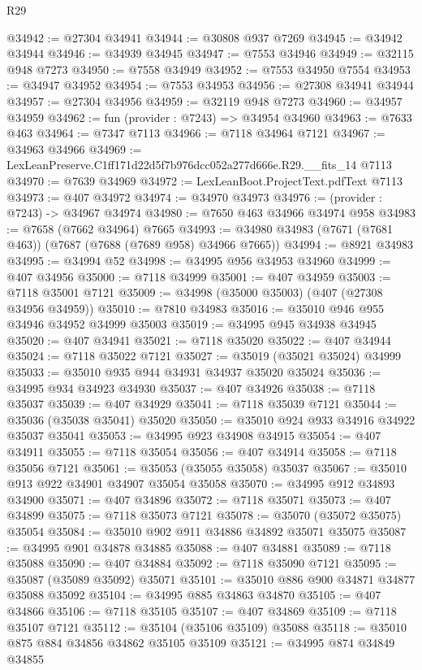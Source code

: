 \begin{lexlean}{R29}
\begin{coremodule}
@34942 := @27304 @34941
@34944 := @30808 @937 @7269
@34945 := @34942 @34944
@34946 := @34939 @34945
@34947 := @7553 @34946
@34949 := @32115 @948 @7273
@34950 := @7558 @34949
@34952 := @7553 @34950 @7554
@34953 := @34947 @34952
@34954 := @7553 @34953
@34956 := @27308 @34941 @34944
@34957 := @27304 @34956
@34959 := @32119 @948 @7273
@34960 := @34957 @34959
@34962 := fun (provider : @7243) => @34954 @34960
@34963 := @7633 @463
@34964 := @7347 @7113
@34966 := @7118 @34964 @7121
@34967 := @34963 @34966
@34969 := LexLeanPreserve.C1ff171d22d5f7b976dcc052a277d666e.R29.__fits_14 @7113
@34970 := @7639 @34969
@34972 := LexLeanBoot.ProjectText.pdfText @7113
@34973 := @407 @34972
@34974 := @34970 @34973
@34976 := (provider : @7243) -> @34967 @34974
@34980 := @7650 @463 @34966 @34974 @958
@34983 := @7658 (@7662 @34964) @7665
@34993 := @34980 @34983 (@7671 (@7681 @463)) (@7687 (@7688 (@7689 @958) @34966 @7665))
@34994 := @8921 @34983
@34995 := @34994 @52
@34998 := @34995 @956 @34953 @34960
@34999 := @407 @34956
@35000 := @7118 @34999
@35001 := @407 @34959
@35003 := @7118 @35001 @7121
@35009 := @34998 (@35000 @35003) (@407 (@27308 @34956 @34959))
@35010 := @7810 @34983
@35016 := @35010 @946 @955 @34946 @34952 @34999 @35003
@35019 := @34995 @945 @34938 @34945
@35020 := @407 @34941
@35021 := @7118 @35020
@35022 := @407 @34944
@35024 := @7118 @35022 @7121
@35027 := @35019 (@35021 @35024) @34999
@35033 := @35010 @935 @944 @34931 @34937 @35020 @35024
@35036 := @34995 @934 @34923 @34930
@35037 := @407 @34926
@35038 := @7118 @35037
@35039 := @407 @34929
@35041 := @7118 @35039 @7121
@35044 := @35036 (@35038 @35041) @35020
@35050 := @35010 @924 @933 @34916 @34922 @35037 @35041
@35053 := @34995 @923 @34908 @34915
@35054 := @407 @34911
@35055 := @7118 @35054
@35056 := @407 @34914
@35058 := @7118 @35056 @7121
@35061 := @35053 (@35055 @35058) @35037
@35067 := @35010 @913 @922 @34901 @34907 @35054 @35058
@35070 := @34995 @912 @34893 @34900
@35071 := @407 @34896
@35072 := @7118 @35071
@35073 := @407 @34899
@35075 := @7118 @35073 @7121
@35078 := @35070 (@35072 @35075) @35054
@35084 := @35010 @902 @911 @34886 @34892 @35071 @35075
@35087 := @34995 @901 @34878 @34885
@35088 := @407 @34881
@35089 := @7118 @35088
@35090 := @407 @34884
@35092 := @7118 @35090 @7121
@35095 := @35087 (@35089 @35092) @35071
@35101 := @35010 @886 @900 @34871 @34877 @35088 @35092
@35104 := @34995 @885 @34863 @34870
@35105 := @407 @34866
@35106 := @7118 @35105
@35107 := @407 @34869
@35109 := @7118 @35107 @7121
@35112 := @35104 (@35106 @35109) @35088
@35118 := @35010 @875 @884 @34856 @34862 @35105 @35109
@35121 := @34995 @874 @34849 @34855

\end{coremodule}
\end{lexlean}
